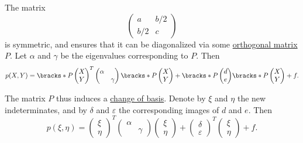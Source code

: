 \begin{algorithm}
  The matrix
  \begin{equation*}
    \begin{pmatrix}
      a          & b / 2 \\
      b / 2 & c
    \end{pmatrix}
  \end{equation*}
  is symmetric, and  ensures that it can be diagonalized via some \hyperref[def:unitary_matrix]{orthogonal matrix} \( P \). Let \( \alpha \) and \( \gamma \) be the eigenvalues corresponding to \( P \). Then
  \begin{equation*}
    p(X, Y)
    =
    \bracks*
      {
        P
        \begin{pmatrix}
          X \\ Y
        \end{pmatrix}
      }^T
    \begin{pmatrix}
      \alpha &       \\
             & \gamma
    \end{pmatrix}
    \bracks*
      {
        P
        \begin{pmatrix}
          X \\ Y
        \end{pmatrix}
      }
    +
    \bracks*
      {
        P
        \begin{pmatrix}
          d \\ e
        \end{pmatrix}
      }
    \bracks*
      {
        P
        \begin{pmatrix}
          X \\ Y
        \end{pmatrix}
      }
    +
    f.
  \end{equation*}

  The matrix \( P \) thus induces a \hyperref[con:change_of_basis]{change of basis}. Denote by \( \xi \) and \( \eta \) the new indeterminates, and by \( \delta \) and \( \varepsilon \) the corresponding images of \( d \) and \( e \). Then
  \begin{equation*}
    p(\xi, \eta)
    =
    \begin{pmatrix}
      \xi \\ \eta
    \end{pmatrix}^T
    \begin{pmatrix}
      \alpha &       \\
             & \gamma
    \end{pmatrix}
    \begin{pmatrix}
      \xi \\ \eta
    \end{pmatrix}
    +
    \begin{pmatrix}
      \delta \\ \varepsilon
    \end{pmatrix}^T
    \begin{pmatrix}
      \xi \\ \eta
    \end{pmatrix}
    +
    f.
  \end{equation*}


\end{algorithm}
